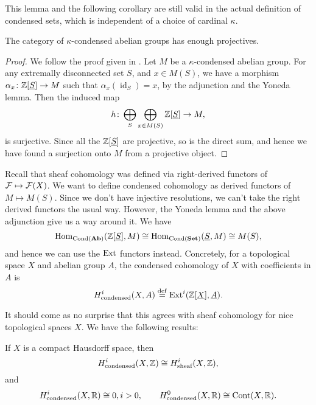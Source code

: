 \documentclass{article}
\DeclareMathOperator{\Cont}{Cont}
\DeclareMathOperator{\id}{id}
\DeclareMathOperator{\Cond}{Cond}
\begin{document}
This lemma and the following corollary are still valid in the actual definition of condensed sets,
which is independent of a choice of cardinal $\kappa$.
\begin{corollary}
    The category of $\kappa$-condensed abelian groups has enough projectives.
\end{corollary}
\begin{proof}
    We follow the proof given in \cite[Theorem 2.2.6]{Dag2021FoundationsCM}.
    Let $M$ be a $\kappa$-condensed abelian group. For any extremally
    disconnected set $S$, and $x\in M(S)$, we have a morphism
    $\alpha_x \colon \mathbb{Z}[\underline{S}] \to M$ such that $\alpha_x(\id_{S}) = x$,
    by the adjunction and the Yoneda lemma. Then the induced map
    \begin{equation*}
        h \colon \bigoplus_S \bigoplus_{x\in M(S)}\mathbb{Z}[\underline{S}] \to M,
    \end{equation*}
    is surjective. Since all the $\mathbb{Z}[\underline{S}]$ are projective,
    so is the direct sum, and hence we have found a surjection onto $M$
    from a projective object.
\end{proof}

\medskip
Recall that sheaf cohomology was defined via right-derived
functors of $\mathcal{F} \mapsto \mathcal{F}(X)$. We want to define
condensed cohomology as derived functors of $M \mapsto M(S)$.
Since we don't have injective resolutions, we can't take
the right derived functors the usual way. However, the
Yoneda lemma and the above adjunction give us a way around it.
We have
\begin{equation*}
    \Hom_{\Cond(\Ab)}(\bbZ[\underline{S}], M) \cong
    \Hom_{\Cond(\Set)}(\underline{S}, M) \cong
    M(S),
\end{equation*}
and hence we can use the $\operatorname{Ext}$ functors instead.
Concretely, for a topological space $X$ and abelian group $A$,
the condensed cohomology of $X$ with coefficients in $A$ is
\begin{equation*}
    H^i_{\text{condensed}}(X, A) \overset{\mathrm{def}}{=} \operatorname{Ext}^i(\mathbb{Z}[\underline{X}], \underline{A}).
\end{equation*}

It should come as no surprise that this agrees with sheaf cohomology
for nice topological spaces $X$. We have the following results:
\begin{theorem}
    If $X$ is a compact Hausdorff space, then
    \begin{equation*}
        H^i_{\textrm{condensed}}(X, \mathbb{Z}) \cong H^i_{\textrm{sheaf}}(X, \mathbb{Z}),
    \end{equation*}
    and
    \begin{equation*}
        H^i_{\textrm{condensed}}(X, \bbR) \cong 0, i>0,\qquad
        H^0_{\textrm{condensed}}(X, \bbR) \cong \Cont(X, \bbR).
    \end{equation*}
\end{theorem}

\nocite{Apa2021condensed}


\end{document}
